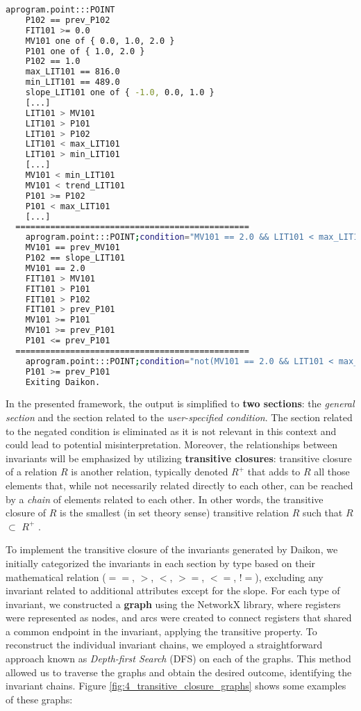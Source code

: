 \begin{lstlisting}[language=bash,numbers=none,caption={Standard Daikon output for \texttt{PLC1} of the iTrust SWaT system},label=lst:4_daikon_output_plc1]
	aprogram.point:::POINT
	P102 == prev_P102
	FIT101 >= 0.0
	MV101 one of { 0.0, 1.0, 2.0 }
	P101 one of { 1.0, 2.0 }
	P102 == 1.0
	max_LIT101 == 816.0
	min_LIT101 == 489.0
	slope_LIT101 one of { -1.0, 0.0, 1.0 }
	[...]
	LIT101 > MV101
	LIT101 > P101
	LIT101 > P102
	LIT101 < max_LIT101
	LIT101 > min_LIT101
	[...]
	MV101 < min_LIT101
	MV101 < trend_LIT101
	P101 >= P102
	P101 < max_LIT101
	[...]
  ===============================================
	aprogram.point:::POINT;condition="MV101 == 2.0 && LIT101 < max_LIT101 - 16 && LIT101 > min_LIT101 + 15"
	MV101 == prev_MV101
	P102 == slope_LIT101
	MV101 == 2.0
	FIT101 > MV101
	FIT101 > P101
	FIT101 > P102
	FIT101 > prev_P101
	MV101 >= P101
	MV101 >= prev_P101
	P101 <= prev_P101
  ===============================================
	aprogram.point:::POINT;condition="not(MV101 == 2.0 && LIT101 < max_LIT101 - 16 && LIT101 > min_LIT101 + 15)"
	P101 >= prev_P101
	Exiting Daikon.
\end{lstlisting}

In the presented framework, the output is simplified to \textbf{two sections}: the \textit{general section} and the section related to the \textit{user-specified condition}. The section related to the negated condition is eliminated as it is not relevant in this context and could lead to potential misinterpretation. Moreover, the relationships between invariants will be emphasized by utilizing \textbf{transitive closures}: transitive closure of a relation $R$ is another relation, typically denoted $R^{+}$ that adds to $R$ all those elements that, while not necessarily related directly to each other, can be reached by a \textit{chain} of elements related to each other. In other words, the transitive closure of $R$ is the smallest (in set theory sense) transitive relation $R$ such that $R$ $\subset$ $R^{+}$ \cite{transitive_closures}. 

\bigskip
To implement the transitive closure of the invariants generated by Daikon, we initially categorized the invariants in each section by type based on their mathematical relation ($==$, $>$, $<$, $>=$, $<=$, $!=$), excluding any invariant related to additional attributes except for the slope. For each type of invariant, we constructed a \textbf{graph} using the NetworkX library, where registers were represented as nodes, and arcs were created to connect registers that shared a common endpoint in the invariant, applying the transitive property. To reconstruct the individual invariant chains, we employed a straightforward approach known as \textit{Depth-first Search} (DFS) on each of the graphs. This method allowed us to traverse the graphs and obtain the desired outcome, identifying the invariant chains. Figure \ref{fig:4_transitive_closure_graphs} shows some examples of these graphs:


